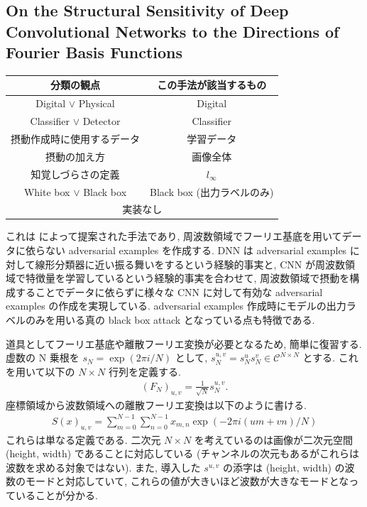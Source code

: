 \subsection{On the Structural Sensitivity of Deep Convolutional Networks to the Directions of Fourier Basis Functions}
\label{subsec:on-the}
%
\begin{table}[htbp]
\begin{center}
\begin{tabular}{|c|c|}
\hline
分類の観点 & この手法が該当するもの \\
\hline
Digital $\lor$ Physical & Digital \\
Classifier $\lor$ Detector & Classifier \\
摂動作成時に使用するデータ & 学習データ \\
摂動の加え方 & 画像全体 \\
知覚しづらさの定義 & $l_{\infty}$ \\
White box $\lor$ Black box & Black box  (出力ラベルのみ) \\
\hline
\multicolumn{2}{|c|}{実装なし} \\
\hline
\end{tabular}
\label{tb:on-the-summary}
\end{center}
\end{table}
%

これは \cite{tsuzuku2019structural} によって提案された手法であり, 周波数領域でフーリエ基底を用いてデータに依らない adversarial examples を作成する.
DNN は adversarial examples に対して線形分類器に近い振る舞いをするという経験的事実と, CNN が周波数領域で特徴量を学習しているという経験的事実を合わせて, 周波数領域で摂動を構成することでデータに依らずに様々な CNN に対して有効な adversarial examples の作成を実現している. 
adversarial examples 作成時にモデルの出力ラベルのみを用いる真の black box attack となっている点も特徴である.

道具としてフーリエ基底や離散フーリエ変換が必要となるため, 簡単に復習する.
虚数の N 乗根を $s_N = \exp (2 \pi i / N)$ として, $s_N^{u,v} = s_N^u s_N^v \in \mathcal{C}^{N \times N}$ とする.
これを用いて以下の $N \times N$ 行列を定義する.
%
\begin{eqnarray}
(F_N)_{u,v} = \frac{1}{\sqrt{N}} s_N^{u, v}.
\label{eq:on-the-matrix}
\end{eqnarray}
%
座標領域から波数領域への離散フーリエ変換は以下のように書ける.
%
\begin{eqnarray}
S(x)_{u,v} = \sum_{m=0}^{N-1} \sum_{n=0}^{N-1} x_{m,n} \exp (- 2 \pi i (u m + v n) / N)
\label{eq:on-the-dft}
\end{eqnarray}
%
これらは単なる定義である.
二次元 $N \times N$ を考えているのは画像が二次元空間 (height, width) であることに対応している (チャンネルの次元もあるがこれらは波数を求める対象ではない).
また, 導入した $s^{u,v}$ の添字は (height, width) の波数のモードと対応していて, これらの値が大きいほど波数が大きなモードとなっていることが分かる.

